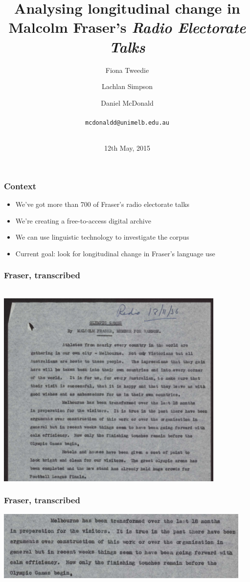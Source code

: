 \documentclass{beamer}       %
\title[\emph{ResPlat}, University of Melbourne]{Analysing longitudinal change in Malcolm Fraser's \emph{Radio Electorate Talks}}
\author[Tweedie, Simpson, McDonald]{Fiona Tweedie \and Lachlan Simpson \and Daniel McDonald\\~\\ \texttt{mcdonaldd@unimelb.edu.au}\\~\\}
\date{12th May, 2015}
\begin{document}


\frame{\titlepage}

\begin{frame}
	\frametitle{Context}
	\begin{itemize}
	\item We've got more than 700 of Fraser's radio electorate talks
	\item We're creating a free-to-access digital archive
	\item We can use linguistic technology to investigate the corpus
	\item Current goal: look for longitudinal change in Fraser's language use
	\end{itemize}
\end{frame}

\begin{frame}
    \frametitle{Fraser, transcribed}
    \centering ~ \\
    \includegraphics[width=0.85\textwidth]{images/mf-olympics}
\end{frame}

\begin{frame}
    \frametitle{Fraser, transcribed}
    \centering
    \includegraphics[width=0.95\textwidth]{images/mf-melbourne}
\end{frame}
\end{document}
